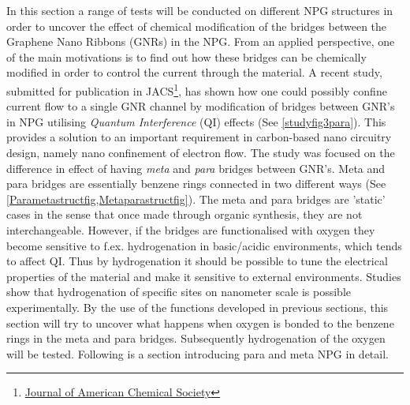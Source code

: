 In this section a range of tests will be conducted on different NPG structures in order to uncover the effect of chemical modification of the bridges between the Graphene Nano Ribbons (GNRs) in the NPG. From an applied perspective, one of the main motivations is to find out how these bridges can be chemically modified in order to control the current through the material. A recent study\cite{unpub}, submitted for publication in JACS\footnote{\href{https://pubs.acs.org/journal/jacsat}{Journal of American Chemical Society}}, has shown how one could possibly confine current flow to a single GNR channel by modification of bridges between GNR's in NPG utilising \textit{Quantum Interference} (QI) effects (See \cref{studyfig3para}). This provides a solution to an important requirement in carbon-based nano circuitry design, namely nano confinement of electron flow. The study was focused on the difference in effect of having \textit{meta} and \textit{para} bridges between GNR's. Meta and para bridges are essentially benzene rings connected in two different ways (See \cref{Parametastructfig,Metaparastructfig}). The meta and para bridges are 'static' cases in the sense that once made through organic synthesis, they are not interchangeable. However, if the bridges are functionalised with oxygen\cite{Soler_2002} they become sensitive to f.ex. hydrogenation in basic/acidic environments, which tends to affect QI. Thus by hydrogenation it should be possible to tune the electrical properties of the material and make it sensitive to external environments. Studies\cite{li_single_2019} show that hydrogenation of specific sites on nanometer scale is possible experimentally. By the use of the functions developed in previous sections, this section will try to uncover what happens when oxygen is bonded to the benzene rings in the meta and para bridges. Subsequently hydrogenation of the oxygen will be tested. Following is a section introducing para and meta NPG in detail.
